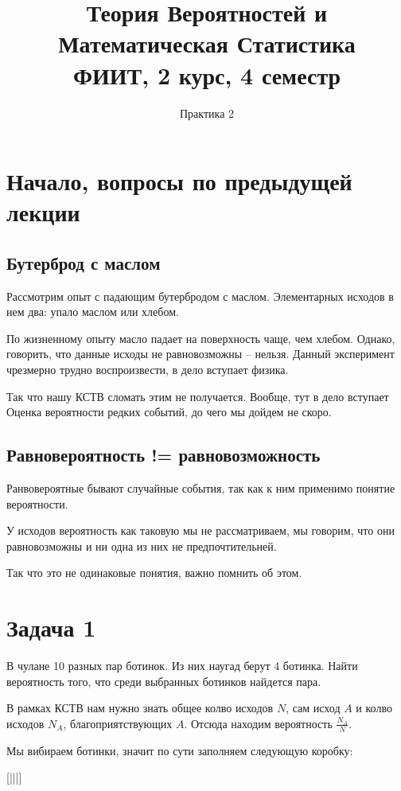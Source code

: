 \documentclass{article}
\title{Теория Вероятностей и Математическая Статистика\\
ФИИТ, 2 курс, 4 семестр}
\author{Практика 2}
\begin{document}
\maketitle

\section{Начало, вопросы по предыдущей лекции}

\subsection{Бутерброд с маслом}

Рассмотрим опыт с падающим бутербродом с маслом. Элементарных исходов в нем два: упало маслом или хлебом.

По жизненному опыту масло падает на поверхность чаще, чем хлебом. Однако, говорить, что данные исходы не равновозможны -- нельзя. Данный эксперимент чрезмерно трудно воспроизвести, в дело вступает физика.

Так что нашу КСТВ сломать этим не получается. Вообще, тут в дело вступает Оценка вероятности редких событий, до чего мы дойдем не скоро.

\subsection{Равновероятность != равновозможность}

Ранвовероятные бывают случайные события, так как к ним применимо понятие вероятности.

У исходов вероятность как таковую мы не рассматриваем, мы говорим, что они равновозможны и ни одна из них не предпочтительней.

Так что это не одинаковые понятия, важно помнить об этом.

\section{Задача 1}

В чулане 10 разных пар ботинок. Из них наугад берут 4 ботинка. Найти вероятность того, что среди выбранных ботинков найдется пара.

\quad

В рамках КСТВ нам нужно знать общее колво исходов $N$, сам исход $A$ и колво исходов $N_A$, благоприятствующих $A$. Отсюда находим вероятность $\frac{N_A}{N}$.

Мы вибираем ботинки, значит по сути заполняем следующую коробку:
\begin{center}
  [\quad|\quad|\quad|\quad]
\end{center}
\end{document}
